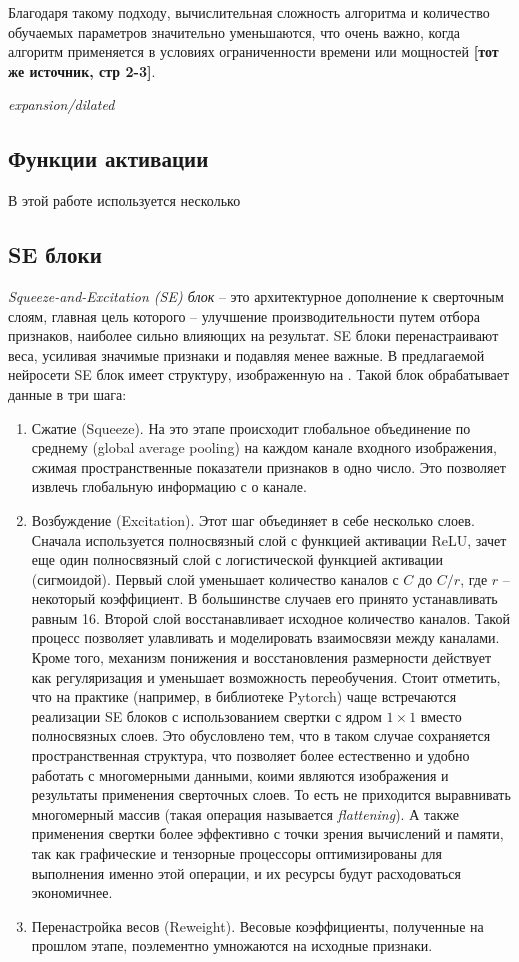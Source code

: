 Благодаря такому подходу, вычислительная сложность алгоритма и количество обучаемых параметров значительно уменьшаются, что очень важно, когда алгоритм применяется в условиях ограниченности времени или мощностей \textbf{[тот же источник, стр 2-3]}.

\textit{expansion/dilated}


\subsection{Функции активации}
В этой работе используется несколько

\subsection{SE блоки}
\textit{Squeeze-and-Excitation (SE) блок} -- это архитектурное дополнение к сверточным слоям, главная цель которого -- улучшение производительности путем отбора признаков, наиболее сильно влияющих на результат. SE блоки перенастраивают веса, усиливая значимые признаки и подавляя менее важные. В предлагаемой нейросети SE блок имеет структуру, изображенную на . Такой блок обрабатывает данные в три шага:
\begin{enumerate}[1.]
	\item Сжатие (Squeeze). На это этапе происходит глобальное объединение по среднему (global average pooling) на каждом канале входного изображения, сжимая пространственные показатели признаков в одно число. Это позволяет извлечь глобальную информацию с о канале.
	
	\item Возбуждение (Excitation). Этот шаг объединяет в себе несколько слоев. Сначала используется полносвязный слой с функцией активации ReLU, зачет еще один полносвязный слой с логистической функцией активации (сигмоидой). Первый слой уменьшает количество каналов с $C$ до $C/r$, где $r$ -- некоторый коэффициент. В большинстве случаев его принято устанавливать равным 16. Второй слой восстанавливает исходное количество каналов. Такой процесс позволяет улавливать и моделировать взаимосвязи между каналами. Кроме того, механизм понижения и восстановления размерности действует как регуляризация и уменьшает возможность переобучения. Стоит отметить, что на практике (например, в библиотеке Pytorch) чаще встречаются реализации SE блоков с использованием свертки с ядром $1 \times 1$ вместо полносвязных слоев. Это обусловлено тем, что в таком случае сохраняется пространственная структура, что позволяет более естественно и удобно работать с многомерными данными, коими являются изображения и результаты применения сверточных слоев. То есть не приходится выравнивать многомерный массив (такая операция называется \textit{flattening}). А также применения свертки более эффективно с точки зрения вычислений и памяти, так как графические и тензорные процессоры оптимизированы для выполнения именно этой операции, и их ресурсы будут расходоваться экономичнее.
	
	\item Перенастройка весов (Reweight). Весовые коэффициенты, полученные на прошлом этапе, поэлементно умножаются на исходные признаки.
\end{enumerate}

